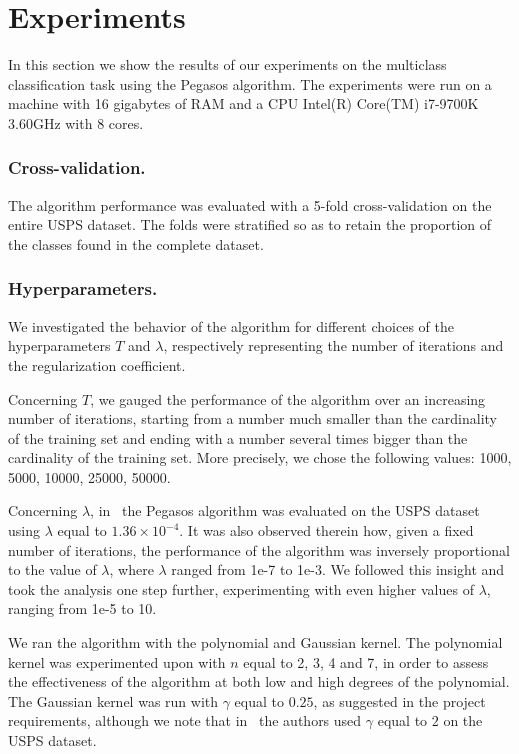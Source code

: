 \documentclass[runningheads]{llncs}
\begin{document}
\section{Experiments}
\label{sec:experiments}

In this section we show the results of our experiments on the multiclass classification task using the Pegasos algorithm. The experiments were run on a machine with 16 gigabytes of RAM and a CPU Intel(R) Core(TM) i7-9700K 3.60GHz with 8 cores.

\subsubsection{Cross-validation.} The algorithm performance was evaluated with a 5-fold cross-validation on the entire USPS dataset. The folds were stratified so as to retain the proportion of the classes found in the complete dataset.

\subsubsection{Hyperparameters.} We investigated the behavior of the algorithm for different choices of the hyperparameters $T$ and $\lambda$, respectively representing the number of iterations and the regularization coefficient.

Concerning $T$, we gauged the performance of the algorithm over an increasing number of iterations, starting from a number much smaller than the cardinality of the training set and ending with a number several times bigger than the cardinality of the training set. More precisely, we chose the following values: 1000, 5000, 10000, 25000, 50000.

Concerning $\lambda$, in~\cite{shalev-pegasos-2011} the Pegasos algorithm was evaluated on the USPS dataset using $\lambda$ equal to $1.36 \times 10^{-4}$. It was also observed therein how, given a fixed number of iterations, the performance of the algorithm was inversely proportional to the value of $\lambda$, where $\lambda$ ranged from 1e-7 to 1e-3. We followed this insight and took the analysis one step further, experimenting with even higher values of $\lambda$, ranging from 1e-5 to 10.

We ran the algorithm with the polynomial and Gaussian kernel. The polynomial kernel was experimented upon with $n$ equal to 2, 3, 4 and 7, in order to assess the effectiveness of the algorithm at both low and high degrees of the polynomial. The Gaussian kernel was run with $\gamma$ equal to $0.25$, as suggested in the project requirements, although we note that in~\cite{shalev-pegasos-2011} the authors used $\gamma$ equal to $2$ on the USPS dataset.
\end{document}
